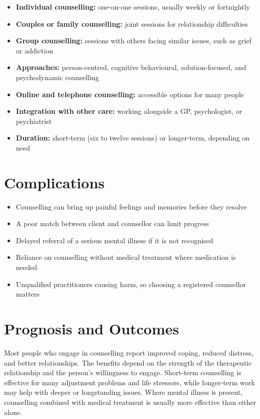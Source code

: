 \begin{itemize}
    \item \textbf{Individual counselling:} one-on-one sessions, usually weekly or fortnightly
    \item \textbf{Couples or family counselling:} joint sessions for relationship difficulties
    \item \textbf{Group counselling:} sessions with others facing similar issues, such as grief or addiction
    \item \textbf{Approaches:} person-centred, cognitive behavioural, solution-focused, and psychodynamic counselling
    \item \textbf{Online and telephone counselling:} accessible options for many people
    \item \textbf{Integration with other care:} working alongside a GP, psychologist, or psychiatrist
    \item \textbf{Duration:} short-term (six to twelve sessions) or longer-term, depending on need
\end{itemize}

\section*{Complications}
\begin{itemize}
    \item Counselling can bring up painful feelings and memories before they resolve
    \item A poor match between client and counsellor can limit progress
    \item Delayed referral of a serious mental illness if it is not recognised
    \item Reliance on counselling without medical treatment where medication is needed
    \item Unqualified practitioners causing harm, so choosing a registered counsellor matters
\end{itemize}

\section*{Prognosis and Outcomes}
Most people who engage in counselling report improved coping, reduced distress, and better relationships. The benefits depend on the strength of the therapeutic relationship and the person's willingness to engage. Short-term counselling is effective for many adjustment problems and life stressors, while longer-term work may help with deeper or longstanding issues. Where mental illness is present, counselling combined with medical treatment is usually more effective than either alone.

